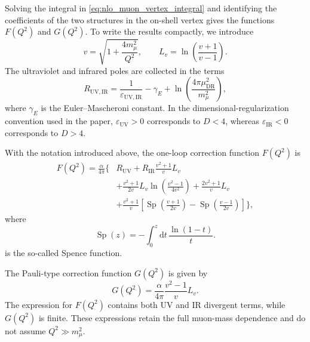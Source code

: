 Solving the integral in \autoref{eq:nlo_muon_vertex_integral} and identifying the coefficients of the two structures in the on-shell vertex gives the functions $F(Q^2)$ and $G(Q^2)$. To write the results compactly, we introduce
\begin{equation}
  v=\sqrt{1+\frac{4m_\mu^2}{Q^2}},
  \qquad L_v=\ln\!\left(\frac{v+1}{v-1}\right).
  \label{eq:nlo_vertex_v}
\end{equation}
The ultraviolet and infrared poles are collected in the terms
\begin{equation}
  R_{\mathrm{UV,IR}}=
  \frac{1}{\varepsilon_{\mathrm{UV,IR}}}-\gamma_E
  +\ln\!\left(\frac{4\pi\mu_{\mathrm{DR}}^2}{m_\mu^2}\right),
  \label{eq:nlo_vertex_regulator_terms}
\end{equation}
where $\gamma_E$ is the Euler--Mascheroni constant. In the dimensional-regularization convention used in the paper, $\varepsilon_{\mathrm{UV}}>0$ corresponds to $D<4$, whereas $\varepsilon_{\mathrm{IR}}<0$ corresponds to $D>4$.

With the notation introduced above, the one-loop correction function $F(Q^2)$ is
\begin{equation}
\begin{split}
  F(Q^2)=\frac{\alpha}{4\pi}\Bigg\{&R_{\mathrm{UV}}
  +R_{\mathrm{IR}}\frac{v^2+1}{v}L_v\\
  &+\frac{v^2+1}{2v}L_v
    \ln\!\left(\frac{v^2-1}{4v^2}\right)
  +\frac{2v^2+1}{v}L_v\\
  &+\frac{v^2+1}{v}\left[
  \operatorname{Sp}\!\left(\frac{v+1}{2v}\right)
  -\operatorname{Sp}\!\left(\frac{v-1}{2v}\right)
  \right]\Bigg\},
\end{split}
\label{eq:nlo_muon_F_unrenormalized}
\end{equation}
where
\begin{equation}
  \operatorname{Sp}(z)
  =-\int_0^z\mathrm{d}t\,\frac{\ln(1-t)}{t}.
\end{equation}
is the so-called Spence function.

The Pauli-type correction function \(G(Q^2)\) is given by
\begin{equation}
  G(Q^2)=\frac{\alpha}{4\pi}
  \frac{v^2-1}{v}L_v.
  \label{eq:nlo_muon_G}
\end{equation}
The expression for $F(Q^2)$ contains both UV and IR divergent terms, while $G(Q^2)$ is finite. These expressions retain the full muon-mass dependence and do not assume $Q^2\gg m_\mu^2$.

